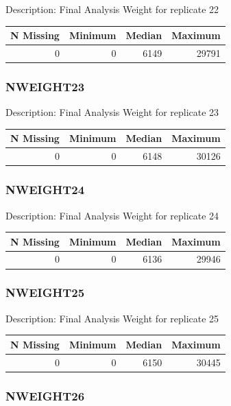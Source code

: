 \documentclass[
]{krantz}
\begin{document}
Description: Final Analysis Weight for replicate 22

\begin{tabular}[t]{r|r|r|r}
\hline
N Missing & Minimum & Median & Maximum\\
\hline
0 & 0 & 6149 & 29791\\
\hline
\end{tabular}

\hypertarget{nweight23}{%
\subsubsection*{NWEIGHT23}\label{nweight23}}


Description: Final Analysis Weight for replicate 23

\begin{tabular}[t]{r|r|r|r}
\hline
N Missing & Minimum & Median & Maximum\\
\hline
0 & 0 & 6148 & 30126\\
\hline
\end{tabular}

\hypertarget{nweight24}{%
\subsubsection*{NWEIGHT24}\label{nweight24}}


Description: Final Analysis Weight for replicate 24

\begin{tabular}[t]{r|r|r|r}
\hline
N Missing & Minimum & Median & Maximum\\
\hline
0 & 0 & 6136 & 29946\\
\hline
\end{tabular}

\hypertarget{nweight25}{%
\subsubsection*{NWEIGHT25}\label{nweight25}}


Description: Final Analysis Weight for replicate 25

\begin{tabular}[t]{r|r|r|r}
\hline
N Missing & Minimum & Median & Maximum\\
\hline
0 & 0 & 6150 & 30445\\
\hline
\end{tabular}

\hypertarget{nweight26}{%
\subsubsection*{NWEIGHT26}\label{nweight26}}
\end{document}
